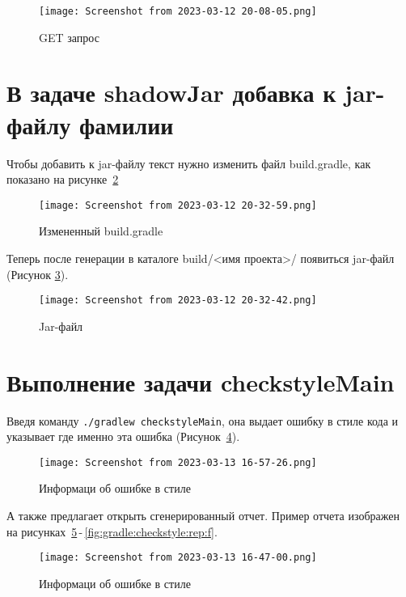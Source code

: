 \begin{figure}[h!tp]
	\centering
	\texttt{[image: Screenshot from 2023-03-12 20-08-05.png]}
	\caption{GET запрос}
	\label{fig:curl:d}
\end{figure}

\section{В задаче shadowJar добавка к jar-файлу фамилии}
Чтобы добавить к jar-файлу текст нужно изменить файл build.gradle, как
показано на рисунке~\ref{fig:jar:rename}

\begin{figure}[h!tp]
	\centering
	\texttt{[image: Screenshot from 2023-03-12 20-32-59.png]}
	\caption{Измененный build.gradle}
	\label{fig:jar:rename}
\end{figure}

Теперь после генерации в каталоге build/<имя проекта>/ появиться jar-файл
(Рисунок \ref{fig:jar:file}).

\begin{figure}[h!tp]
	\centering
	\texttt{[image: Screenshot from 2023-03-12 20-32-42.png]}
	\caption{Jar-файл}
	\label{fig:jar:file}
\end{figure}

\section{Выполнение задачи checkstyleMain}
Введя команду \texttt{./gradlew checkstyleMain}, она выдает ошибку в
стиле кода и указывает где именно эта ошибка
(Рисунок~\ref{fig:gradle:checkstyleMain}).

\begin{figure}[h!tp]
	\centering
	\texttt{[image: Screenshot from 2023-03-13 16-57-26.png]}
	\caption{Информаци об ошибке в стиле}
	\label{fig:gradle:checkstyleMain}
\end{figure}

А также предлагает открыть сгенерированный отчет. Пример отчета изображен на
рисунках~\ref{fig:gradle:checkstyle:rep:s}\,-\,\ref{fig:gradle:checkstyle:rep:f}.

\begin{figure}[h!tp]
	\centering
	\texttt{[image: Screenshot from 2023-03-13 16-47-00.png]}
	\caption{Информаци об ошибке в стиле}
	\label{fig:gradle:checkstyle:rep:s}
\end{figure}

